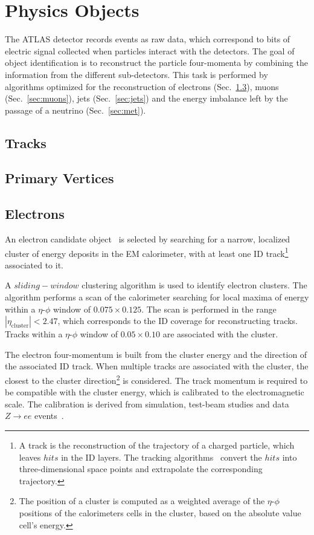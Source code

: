 \chapter{Physics Objects}
\label{sec:objects}

The ATLAS detector records events as raw data, 
which correspond to bits of electric signal collected 
when particles interact with the detectors. 
The goal of object identification is to reconstruct the particle four-momenta
by combining the information from the different sub-detectors.
This task is performed by algorithms optimized for the reconstruction of
electrons (Sec.~\ref{sec:electrons}), muons (Sec.~\ref{sec:muons}), 
jets (Sec.~\ref{sec:jets}) and the energy imbalance left
by the passage of a neutrino (Sec.~\ref{sec:met}).

\section{Tracks}
\label{sec:tracks}

\section{Primary Vertices}
\label{sec:pv}

\section{Electrons}
\label{sec:electrons}

An electron candidate object~\cite{elereco} is selected by searching for a narrow, 
localized cluster of energy deposits in the EM calorimeter, 
with at least one ID track\footnote{A track is the reconstruction 
of the trajectory of a charged particle, which leaves $hits$ in the 
ID layers. The tracking algorithms~\cite{trackalgos} convert the 
$hits$ into three-dimensional space points and extrapolate the 
corresponding trajectory.}
associated to it.

A $sliding-window$ clustering algorithm is used to identify electron 
clusters. The algorithm performs a scan of the calorimeter searching 
for local maxima of energy
within a $\eta$-$\phi$ window of $0.075\times{}0.125$.
The scan is performed in the range $|\eta_{\mathrm{cluster}}|<2.47$, 
which corresponds to the ID coverage for reconstructing tracks. 
Tracks within a $\eta$-$\phi$ window of $0.05\times{}0.10$ are 
associated with the cluster.

The electron four-momentum is built from the cluster energy
and the direction of the associated ID track.
When multiple tracks are associated with the cluster, the closest
to the cluster direction\footnote{The position of a cluster 
is computed as a weighted average of the $\eta$-$\phi$ positions 
of the calorimeters cells in the cluster, based on the absolute 
value cell's energy.} is considered.
The track momentum is required to be compatible with the cluster energy,
which is calibrated to the electromagnetic scale. The calibration is
derived from simulation, test-beam studies and data $Z\to ee$ events~\cite{elecalib}.

